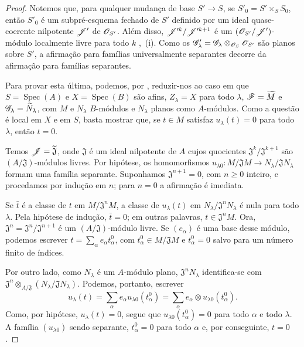 \begin{proof}
Notemos que, para
qualquer mudança de
base $S'\to S$, se
$S'_0=S'\times_S S_0$,
então $S'_0$ é um
subpré-esquema fechado
de $S'$ definido por
um ideal quase-coerente
nilpotente $\mathscr{J}'$
de $\mathscr{O}_{S'}$.
Além disso,
$\mathscr{J}'^k/
\mathscr{J}'^{k+1}$
é um
$(\mathscr{O}_{S'}/
\mathscr{J}')$-módulo
localmente livre para
todo $k$
,~(i).
Como os
$\mathscr{G}'_\lambda=
\mathscr{G}_\lambda
\otimes_{\mathscr{O}_S}
\mathscr{O}_{S'}$
são planos sobre
$S'$, a afirmação
para famílias
universalmente
separantes decorre
da afirmação para
famílias separantes.

Para provar esta
última, podemos,
por ,
reduzir-nos ao caso
em que
$S=\operatorname{Spec}(A)$
e
$X=\operatorname{Spec}(B)$
são afins,
$Z_\lambda=X$ para
todo $\lambda$,
$\mathscr{F}=\widetilde M$
e
$\mathscr{G}_\lambda=
\widetilde N_\lambda$,
com $M$ e
$N_\lambda$
$B$-módulos e
$N_\lambda$ planos
como $A$-módulos.
Como a questão é
local em $X$ e em
$S$, basta mostrar
que, se $t\in M$
satisfaz
$u_\lambda(t)=0$
para todo $\lambda$,
então $t=0$.

Temos
$\mathscr{J}=
\widetilde{\mathfrak J}$,
onde $\mathfrak J$
é um ideal nilpotente
de $A$ cujos quocientes
$\mathfrak J^k/
\mathfrak J^{k+1}$
são
$(A/\mathfrak J)$-módulos
livres. Por hipótese,
os homomorfismos
$u_{\lambda0}:
M/\mathfrak JM\to
N_\lambda/
\mathfrak JN_\lambda$
formam uma família
separante. Suponhamos
$\mathfrak J^{n+1}=0$,
com $n\geq0$ inteiro,
e procedamos por
indução em $n$; para
$n=0$ a afirmação
é imediata.

Se $\bar t$ é a
classe de $t$ em
$M/\mathfrak J^nM$,
a classe de
$u_\lambda(t)$ em
$N_\lambda/
\mathfrak J^nN_\lambda$
é nula para todo
$\lambda$. Pela
hipótese de indução,
$\bar t=0$; em outras
palavras,
$t\in\mathfrak J^nM$.
Ora,
$\mathfrak J^n=
\mathfrak J^n/
\mathfrak J^{n+1}$
é um
$(A/\mathfrak J)$-módulo
livre. Se
$(e_\alpha)$ é uma
base desse módulo,
podemos escrever
$t=\sum_\alpha
e_\alpha t^0_\alpha$,
com
$t^0_\alpha\in
M/\mathfrak JM$ e
$t^0_\alpha=0$ salvo
para um número finito
de índices.

Por outro lado,
como $N_\lambda$
é um $A$-módulo
plano,
$\mathfrak J^n
N_\lambda$
identifica-se com
$\mathfrak J^n
\otimes_{A/\mathfrak J}
(N_\lambda/
\mathfrak JN_\lambda)$.
Podemos, portanto,
escrever
\[
u_\lambda(t)=
\sum_\alpha
e_\alpha
u_{\lambda0}(t^0_\alpha)
=
\sum_\alpha
e_\alpha\otimes
u_{\lambda0}(t^0_\alpha).
\]
Como, por hipótese,
$u_\lambda(t)=0$,
segue que
$u_{\lambda0}(t^0_\alpha)
=0$ para todo
$\alpha$ e todo
$\lambda$. A família
$(u_{\lambda0})$
sendo separante,
$t^0_\alpha=0$
para todo $\alpha$
e, por conseguinte,
$t=0$.
\end{proof}

